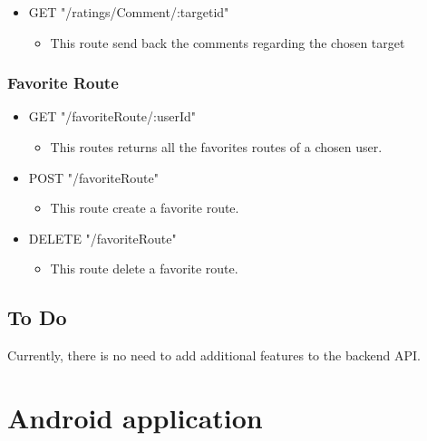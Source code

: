 \begin{itemize}
	\item GET "/ratings/Comment/:targetid"
	\begin{itemize}
		\item This route send back the comments regarding the chosen target
	\end{itemize}
\end{itemize}

\subsection{Favorite Route}
\begin{itemize}
	\item GET "/favoriteRoute/:userId"
	\begin{itemize}
		\item This routes returns all the favorites routes of a chosen user.
	\end{itemize}
\end{itemize}

\begin{itemize}
	\item POST "/favoriteRoute"
	\begin{itemize}
		\item This route create a favorite route.
	\end{itemize}
\end{itemize}

\begin{itemize}
	\item DELETE "/favoriteRoute"
	\begin{itemize}
		\item This route delete a favorite route.
	\end{itemize}
\end{itemize}

\section{To Do}

Currently, there is no need to add additional features to the backend API.

\chapter{Android application}


